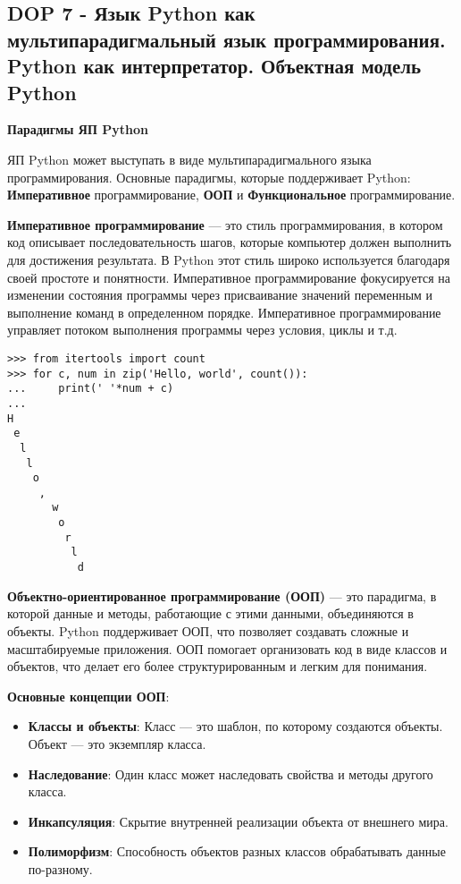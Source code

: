 \subsection*{DOP 7 - Язык Python как мультипарадигмальный язык программирования. Python как интерпретатор. Объектная модель Python}

\textbf{Парадигмы ЯП Python}

ЯП Python может выступать в виде мультипарадигмального языка программирования. Основные парадигмы, которые поддерживает Python: \textbf{Императивное} программирование, \textbf{ООП} и \textbf{Функциональное} программирование.

\textbf{Императивное программирование} — это стиль программирования, в котором код описывает последовательность шагов, которые компьютер должен выполнить для достижения результата. В Python этот стиль широко используется благодаря своей простоте и понятности. Императивное программирование фокусируется на изменении состояния программы через присваивание значений переменным и выполнение команд в определенном порядке. Императивное программирование управляет потоком выполнения программы через условия, циклы и т.д.

\begin{verbatim}
>>> from itertools import count
>>> for c, num in zip('Hello, world', count()):
...     print(' '*num + c)
...
H
 e
  l
   l
    o
     ,
       w
        o
         r
          l
           d
\end{verbatim}

\textbf{Объектно-ориентированное программирование (ООП)} — это парадигма, в которой данные и методы, работающие с этими данными, объединяются в объекты. Python поддерживает ООП, что позволяет создавать сложные и масштабируемые приложения. ООП помогает организовать код в виде классов и объектов, что делает его более структурированным и легким для понимания.

\textbf{Основные концепции ООП}:
\begin{itemize}
    \item \textbf{Классы и объекты}: Класс — это шаблон, по которому создаются объекты. Объект — это экземпляр класса.
    \item \textbf{Наследование}: Один класс может наследовать свойства и методы другого класса.
    \item \textbf{Инкапсуляция}: Скрытие внутренней реализации объекта от внешнего мира.
    \item \textbf{Полиморфизм}: Способность объектов разных классов обрабатывать данные по-разному.
\end{itemize}

